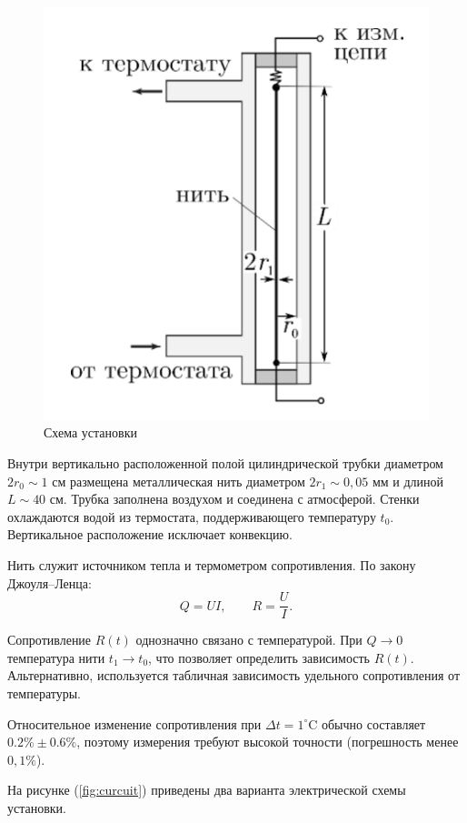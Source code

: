 \documentclass[a4paper,12pt]{article} %
\begin{document}
\begin{figure}[h!]
  \centering
  \includegraphics[scale = 0.5]{setup.png}
  \caption{Схема установки}
  \label{fig:setup}
\end{figure}

Внутри вертикально расположенной полой цилиндрической трубки диаметром $2r_0 \sim 1$ см размещена металлическая нить диаметром $2r_1 \sim 0{,}05$ мм и длиной $L \sim 40$ см. Трубка заполнена воздухом и соединена с атмосферой. Стенки охлаждаются водой из термостата, поддерживающего температуру $t_0$. Вертикальное расположение исключает конвекцию.

Нить служит источником тепла и термометром сопротивления. По закону Джоуля–Ленца:
\[
Q = UI, \qquad R = \frac{U}{I}.
\]

Сопротивление $R(t)$ однозначно связано с температурой. При $Q \to 0$ температура нити $t_1 \to t_0$, что позволяет определить зависимость $R(t)$. Альтернативно, используется табличная зависимость удельного сопротивления от температуры.

Относительное изменение сопротивления при $\Delta t = 1^\circ$C обычно составляет $0.2\% \pm 0.6\%$, поэтому измерения требуют высокой точности (погрешность менее $0{,}1\%$).

На рисунке (\ref{fig:curcuit}) приведены два варианта электрической схемы установки.
\end{document}
